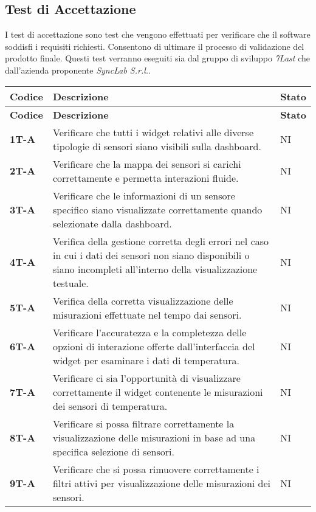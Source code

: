 \subsection{Test di Accettazione}
I test di accettazione sono test che vengono effettuati per verificare che il software soddisfi i requisiti richiesti. Consentono di ultimare il processo di validazione del prodotto finale. Questi test verranno eseguiti sia dal gruppo di sviluppo \textit{7Last} che dall'azienda proponente \textit{SyncLab S.r.l.}. \\
\begin{longtable}{|>{\raggedright\arraybackslash}m{}|>{\raggedright\arraybackslash}m{}|>{\raggedright\arraybackslash}m{}|}
	\hline
	\textbf{Codice} & \textbf{Descrizione} & \textbf{Stato} \\
	\hline
	\endfirsthead
	\hline
	\textbf{Codice} & \textbf{Descrizione} & \textbf{Stato} \\
	\endhead
	\textbf{1T-A}   & Verificare che tutti i widget relativi alle diverse tipologie di sensori siano visibili sulla dashboard. & NI\\
	\hline
	\textbf{2T-A}   & Verificare che la mappa dei sensori si carichi correttamente e permetta interazioni fluide. & NI\\
	\hline
	\textbf{3T-A}   & Verificare che le informazioni di un sensore specifico siano visualizzate correttamente quando selezionate dalla dashboard. & NI\\
	\hline
	\textbf{4T-A}   & Verifica della gestione corretta degli errori nel caso in cui i dati dei sensori non siano disponibili o siano incompleti all’interno della visualizzazione testuale. & NI\\
	\hline
	\textbf{5T-A}   & Verifica della corretta visualizzazione delle misurazioni effettuate nel tempo dai sensori. & NI\\
	\hline
	\textbf{6T-A}   & Verificare l’accuratezza e la completezza delle opzioni di interazione offerte dall’interfaccia del widget per esaminare i dati di temperatura. & NI\\
	\hline
	\textbf{7T-A}   & Verificare ci sia l’opportunità di visualizzare correttamente il widget contenente le misurazioni dei sensori di temperatura. 	& NI\\
	\hline
	\textbf{8T-A}   & Verificare si possa filtrare correttamente la visualizzazione delle misurazioni in base ad una specifica selezione di sensori. & NI\\
	\hline
	\textbf{9T-A}   & Verificare che si possa rimuovere correttamente i filtri attivi per visualizzazione delle misurazioni dei sensori. & NI\\

\end{longtable}
